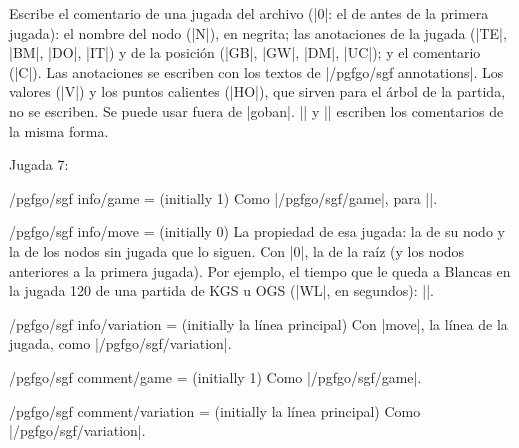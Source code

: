 \begin{command}{\sgfcomment{}}
	Escribe el comentario de una jugada del archivo (|0|: el de antes de la primera jugada): el nombre del nodo (|N|), en negrita; las anotaciones de la jugada (|TE|, |BM|, |DO|, |IT|) y de la posición (|GB|, |GW|, |DM|, |UC|); y el comentario (|C|). Las anotaciones se escriben con los textos de |/pgfgo/sgf annotations|. Los valores (|V|) y los puntos calientes (|HO|), que sirven para el árbol de la partida, no se escriben. Se puede usar fuera de |goban|. |\sgfanimation| y |\sgfdiagrams| escriben los comentarios de la misma forma.

	\begin{codeexample}[]
		Jugada 7: 
	\end{codeexample}
\end{command}

\begin{key}{/pgfgo/sgf info/game =  (initially 1)}
	Como |/pgfgo/sgf/game|, para |\sgfinfo|.
\end{key}

\begin{key}{/pgfgo/sgf info/move =  (initially 0)}
	La propiedad de esa jugada: la de su nodo y la de los nodos sin jugada que lo siguen. Con |0|, la de la raíz (y los nodos anteriores a la primera jugada). Por ejemplo, el tiempo que le queda a Blancas en la jugada 120 de una partida de KGS u OGS (|WL|, en segundos): ||.
\end{key}

\begin{key}{/pgfgo/sgf info/variation =  (initially la línea principal)}
	Con |move|, la línea de la jugada, como |/pgfgo/sgf/variation|.
\end{key}

\begin{key}{/pgfgo/sgf comment/game =  (initially 1)}
	Como |/pgfgo/sgf/game|.
\end{key}

\begin{key}{/pgfgo/sgf comment/variation =  (initially la línea principal)}
	Como |/pgfgo/sgf/variation|.

	\begin{codeexample}[]
	\end{codeexample}
\end{key}

